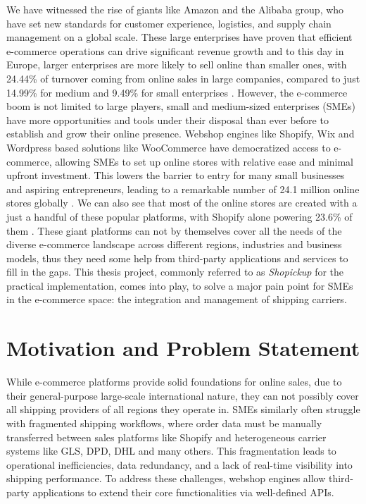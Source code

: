 \documentclass{imc-inf}
\begin{document}
We have witnessed the rise of giants like Amazon and the Alibaba group, who have set new standards for customer experience, logistics, and supply chain management on a global scale. These large enterprises have proven that efficient e-commerce operations can drive significant revenue growth and to this day in Europe, larger enterprises are more likely to sell online than smaller ones, with 24.44\% of turnover coming from online sales in large companies, compared to just 14.99\% for medium and 9.49\% for small enterprises \cite{eurostatEcommerceStatistics2025}.
However, the e-commerce boom is not limited to large players, small and medium-sized enterprises (SMEs) have more opportunities and tools under their disposal than ever before to establish and grow their online presence.
Webshop engines like Shopify, Wix and Wordpress based solutions like WooCommerce have democratized access to e-commerce, allowing SMEs to set up online stores with relative ease and minimal upfront investment.
This lowers the barrier to entry for many small businesses and aspiring entrepreneurs, leading to a remarkable number of 24.1 million online stores globally \cite{capitaloneHowManyOnline2025}.
We can also see that most of the online stores are created with a just a handful of these popular platforms, with Shopify alone powering 23.6\% of them \cite{capitaloneHowManyOnline2025}.
These giant platforms can not by themselves cover all the needs of the diverse e-commerce landscape across different regions, industries and business models, thus they need some help from third-party applications and services to fill in the gaps.
This thesis project, commonly referred to as \textit{Shopickup} for the practical implementation, comes into play, to solve a major pain point for SMEs in the e-commerce space: the integration and management of shipping carriers.

\section{Motivation and Problem Statement}
While e-commerce platforms provide solid foundations for online sales, due to their general-purpose large-scale international nature, they can not possibly cover all shipping providers of all regions they operate in.
SMEs similarly often struggle with fragmented shipping workflows, where order data must be manually transferred between sales platforms like Shopify and heterogeneous carrier systems like GLS, DPD, DHL and many others.
This fragmentation leads to operational inefficiencies, data redundancy, and a lack of real-time visibility into shipping performance.
To address these challenges, webshop engines allow third-party applications to extend their core functionalities via well-defined APIs.
\end{document}
